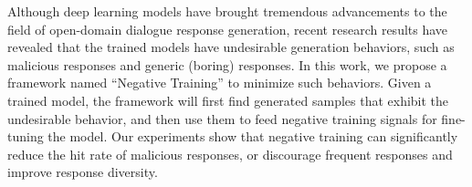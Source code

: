 Although deep learning models have brought tremendous advancements to the field of open-domain dialogue response generation, recent research results have revealed that the trained models have undesirable generation behaviors, such as malicious responses and generic (boring) responses. In this work, we propose a framework named ``Negative Training'' to minimize such behaviors. Given a trained model, the framework will first find generated samples that exhibit the undesirable behavior, and then use them to feed negative training signals for fine-tuning the model. Our experiments show that negative training can significantly reduce the hit rate of malicious responses, or discourage frequent responses and improve response diversity.
